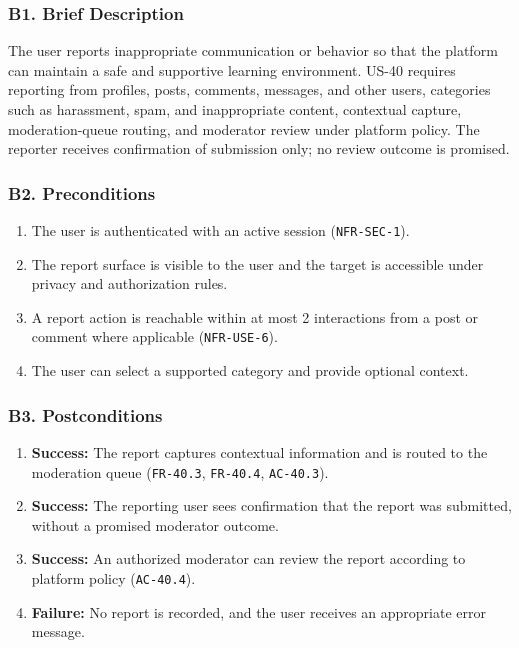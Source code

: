\documentclass[12pt]{article}
\begin{document}
\hypertarget{sec:b1-brief-description}{}
\subsubsection*{B1. Brief Description}
\par\medskip

The user reports inappropriate communication or behavior so that the platform can maintain a safe and supportive learning environment. US-40 requires reporting from profiles, posts, comments, messages, and other users, categories such as harassment, spam, and inappropriate content, contextual capture, moderation-queue routing, and moderator review under platform policy. The reporter receives confirmation of submission only; no review outcome is promised.
\par\medskip

\hypertarget{sec:b2-preconditions}{}
\subsubsection*{B2. Preconditions}
\par\medskip

\begin{enumerate}
\item The user is authenticated with an active session (\texttt{NFR-SEC-1}).
\item The report surface is visible to the user and the target is accessible under privacy and authorization rules.
\item A report action is reachable within at most 2 interactions from a post or comment where applicable (\texttt{NFR-USE-6}).
\item The user can select a supported category and provide optional context.
\end{enumerate}
\par\medskip

\hypertarget{sec:b3-postconditions}{}
\subsubsection*{B3. Postconditions}
\par\medskip

\begin{enumerate}
\item \textbf{Success:} The report captures contextual information and is routed to the moderation queue (\texttt{FR-40.3}, \texttt{FR-40.4}, \texttt{AC-40.3}).
\item \textbf{Success:} The reporting user sees confirmation that the report was submitted, without a promised moderator outcome.
\item \textbf{Success:} An authorized moderator can review the report according to platform policy (\texttt{AC-40.4}).
\item \textbf{Failure:} No report is recorded, and the user receives an appropriate error message.
\end{enumerate}
\par\medskip
\end{document}
